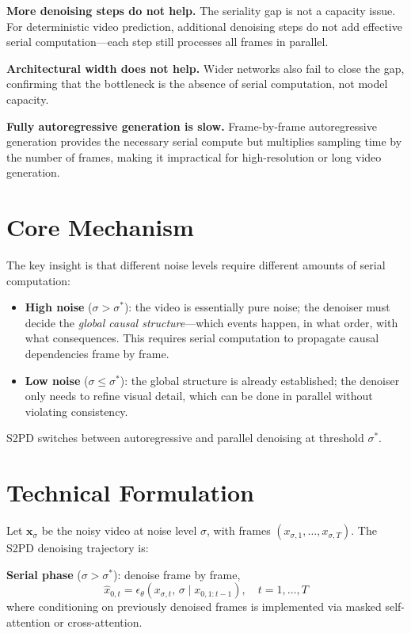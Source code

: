 \documentclass[10pt,twocolumn]{article}
\begin{document}
\textbf{More denoising steps do not help.} The seriality gap is not a capacity
issue. For deterministic video prediction, additional denoising steps do not
add effective serial computation---each step still processes all frames in
parallel.

\textbf{Architectural width does not help.} Wider networks also fail to close
the gap, confirming that the bottleneck is the absence of serial computation,
not model capacity.

\textbf{Fully autoregressive generation is slow.} Frame-by-frame autoregressive
generation provides the necessary serial compute but multiplies sampling time
by the number of frames, making it impractical for high-resolution or long
video generation.

\section{Core Mechanism}

The key insight is that different noise levels require different amounts of
serial computation:

\begin{itemize}[itemsep=2pt,parsep=0pt]
  \item \textbf{High noise} ($\sigma > \sigma^*$): the video is essentially pure
    noise; the denoiser must decide the \emph{global causal structure}---which
    events happen, in what order, with what consequences. This requires serial
    computation to propagate causal dependencies frame by frame.
  \item \textbf{Low noise} ($\sigma \leq \sigma^*$): the global structure is
    already established; the denoiser only needs to refine visual detail, which
    can be done in parallel without violating consistency.
\end{itemize}

S2PD switches between autoregressive and parallel denoising at threshold $\sigma^*$.

\section{Technical Formulation}

Let $\mathbf{x}_\sigma$ be the noisy video at noise level $\sigma$, with frames
$(x_{\sigma,1}, \ldots, x_{\sigma,T})$. The S2PD denoising trajectory is:

\textbf{Serial phase} ($\sigma > \sigma^*$): denoise frame by frame,
\[
\hat{x}_{0,t} = \epsilon_\theta(x_{\sigma,t},\, \sigma \mid x_{0,1:t-1}), \quad t = 1,\ldots,T
\]
where conditioning on previously denoised frames is implemented via masked
self-attention or cross-attention.
\end{document}
